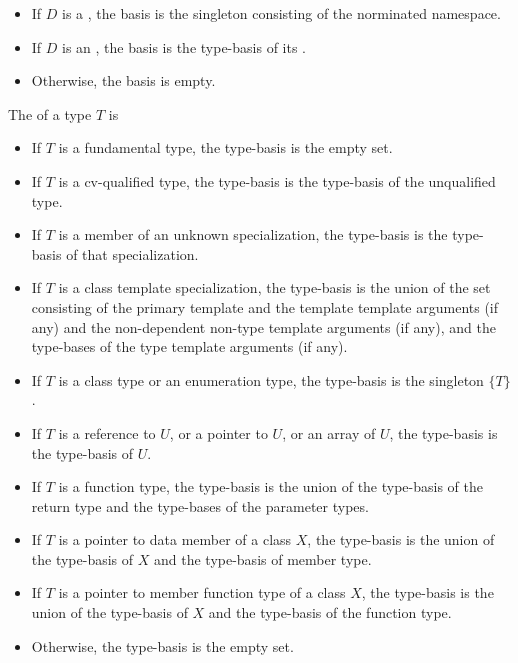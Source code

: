 \begin{std.txt}
\begin{itemize}
\item If $D$ is a , the basis is the
singleton consisting of the norminated namespace.

\item If $D$ is an , the basis is the type-basis of its .

\item Otherwise, the basis is empty.
\end{itemize}

The  of a type $T$ is
\begin{itemize}
\item If $T$ is a fundamental type, the type-basis is the empty set.
\item If $T$ is a cv-qualified type, the type-basis is the type-basis of
the unqualified type.
\item If $T$ is a member of an unknown specialization, the type-basis
is the type-basis of that specialization.
\item If $T$ is a class template specialization, the type-basis
is the union of the set consisting of the primary template and the
template template arguments (if any) and the non-dependent non-type
template arguments (if any), and the type-bases of the type 
template arguments (if any).
\item If $T$ is a class type or an enumeration type, 
the type-basis is the singleton $\{ T \}$.
\item If $T$ is a reference to $U$, or a pointer to $U$, or an array of $U$, the
type-basis is the type-basis of $U$.
\item If $T$ is a function type, the type-basis is the union of the
type-basis of the return type and the type-bases of the parameter types.
\item If $T$ is a pointer to data member of a class $X$, the type-basis is
the union of the type-basis of $X$ and the type-basis of member type.
\item If $T$ is a pointer to member function type of a class $X$, the
type-basis is the union of the type-basis of $X$ and the type-basis of
the function type.
\item Otherwise, the type-basis is the empty set.
\end{itemize}



\end{std.txt}
